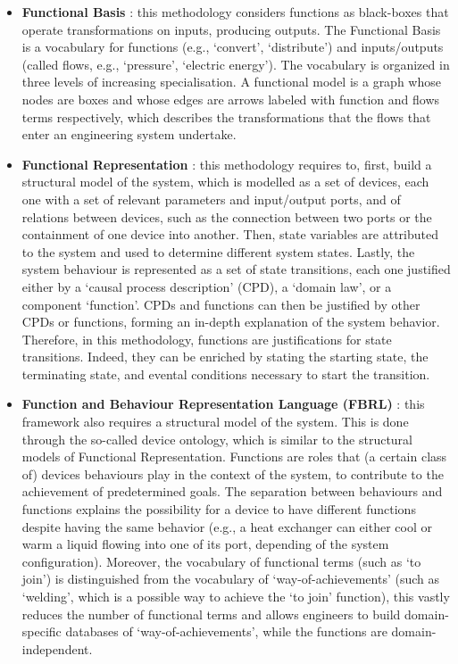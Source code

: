 \documentclass[
]{ceurart}
\begin{document}
\begin{itemize}
    \item \textbf{Functional Basis} \cite{hirtz_functional_2002,stone_development_2000}: this methodology considers functions as black-boxes that operate transformations on inputs, producing outputs. The Functional Basis is a vocabulary for functions (e.g., `convert', `distribute') and inputs/outputs (called flows, e.g., `pressure', `electric energy'). The vocabulary is organized in three levels of increasing specialisation. A functional model is a graph whose nodes are boxes and whose edges are arrows labeled with function and flows terms respectively, which describes the transformations that the flows that enter an engineering system undertake.
    \item \textbf{Functional Representation} \cite{chandrasekaranFunctionalRepresentationDesign1993}: this methodology requires to, first, build a structural model of the system, which is modelled as a set of devices, each one with a set of relevant parameters and input/output ports, and of relations between devices, such as the connection between two ports or the containment of one device into another. Then, state variables are attributed to the system and used to determine different system states. Lastly, the system behaviour is represented as a set of state transitions, each one justified either by a `causal process description' (CPD), a `domain law', or a component `function'. CPDs and functions can then be justified by other CPDs or functions, forming an in-depth explanation of the system behavior. Therefore, in this methodology, functions are justifications for state transitions. Indeed, they can be enriched by stating the starting state, the terminating state, and evental conditions necessary to start the transition.
    \item \textbf{Function and Behaviour Representation Language (FBRL)} \cite{sasajimaFBRLFunctionBehavior1995, kitamuraOntologicalModelDevice2006}: this framework also requires a structural model of the system. This is done through the so-called device ontology, which is similar to the structural models of Functional Representation. %
    Functions are roles that (a certain class of) devices behaviours play in the context of the system, to contribute to the achievement of predetermined goals. The separation between behaviours and functions explains the possibility for a device to have different functions despite having the same behavior (e.g., a heat exchanger can either cool or warm a liquid flowing into one of its port, depending of the system configuration). Moreover, the vocabulary of functional terms (such as `to join') is distinguished from the vocabulary of `way-of-achievements' (such as `welding', which is a possible way to achieve the `to join' function), this vastly reduces the number of functional terms and allows engineers to build domain-specific databases of `way-of-achievements', while the functions are domain-independent. 

\end{itemize}
\end{document}
